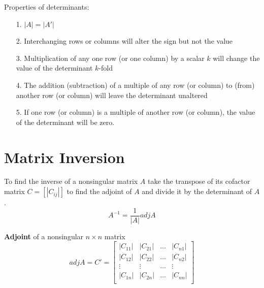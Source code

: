 \documentclass{./../Latex/handout}
\begin{document}
Properties of determinants: 
 \begin{itemize}
\item[1.] $ |A| = |A'|$ 
\item[2.] Interchanging rows or columns will alter the sign but not the value
\item[3.] Multiplication of any one row (or one column) by a scalar $k$ will change the value of the determinant $k$-fold
\item[4.] The addition (subtraction) of a multiple of any row (or column) to (from) another row (or column) will leave the determinant unaltered
\item[5.] If one row (or column) is a multiple of another row (or column), the value of the determinant will be zero. 
\end{itemize}




\section{Matrix Inversion}

To find the inverse of a nonsingular matrix $A$ take the transpose of its cofactor matrix $C = [|C_{ij}|]$ to find the adjoint of $A$ and divide it by the determinant of $A$. 
$$ A^{-1} = \frac{1}{|A|} adj A$$ 

 \textbf{Adjoint} of a nonsingular $n \times n$ matrix \\
 $$adj A = C' = \left[\begin{array}{llll}
|C_{11}| & |C_{21}| & \hdots & |C_{n1}| \\
|C_{12}| & |C_{22}| & \hdots &  |C_{n2}| \\
\vdots &\vdots & \hdots &  \vdots \\
|C_{1n}| & |C_{2n}| & \hdots & |C_{nn}| \\
\end{array}\right]$$
\vspace{1em}
\end{document}
